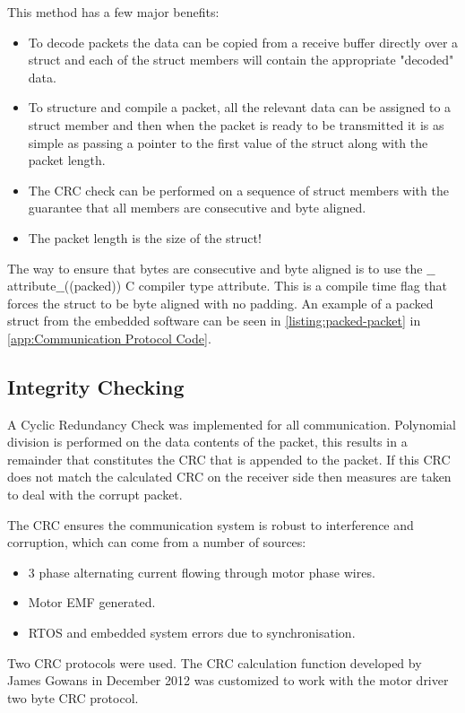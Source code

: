 This method has a few major benefits:
\begin{itemize}
\item To decode packets the data can be copied from a receive buffer directly over a struct and each of the struct members will contain the appropriate "decoded" data.
\item To structure and compile a packet, all the relevant data can be assigned to a struct member and then when the packet is ready to be transmitted it is as simple as passing a pointer to the first value of the struct along with the packet length.
\item The CRC check can be performed on a sequence of struct members with the guarantee that all members are consecutive and byte aligned.
\item The packet length is the size of the struct!
\end{itemize}

The way to ensure that bytes are consecutive and byte aligned is to use the $\_\_$attribute$\_\_$((packed)) C compiler type attribute. This is a compile time flag that forces the struct to be byte aligned with no padding. An example of a packed struct from the embedded software can be seen in \cref{listing:packed-packet} in \cref{app:Communication Protocol Code}.

\subsection{Integrity Checking}

A Cyclic Redundancy Check was implemented for all communication. Polynomial division is performed on the data contents of the packet, this results in a remainder that constitutes the CRC that is appended to the packet. If this CRC does not match the calculated CRC on the receiver side then measures are taken to deal with the corrupt packet. 

The CRC ensures the communication system is robust to interference and corruption, which can come from a number of sources:

\begin{itemize}
\item 3 phase alternating current flowing through motor phase wires.
\item Motor EMF generated.
\item RTOS and embedded system errors due to synchronisation.
\end{itemize}

Two CRC protocols were used. The CRC calculation function developed by James Gowans in December 2012 was customized to work with the motor driver two byte CRC protocol.

